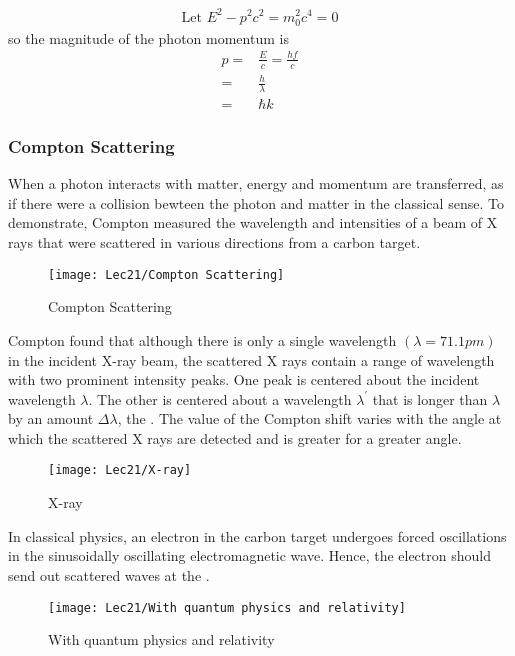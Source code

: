 \begin{align*}
    \text{Let } E^2-p^2c^2=m_0^2c^4=0
\end{align*}
so the magnitude of the photon momentum is 
\begin{align*}
    p=&\frac{E}{c}=\frac{hf}{c}\\
    =&\frac{h}{\lambda}\\
    =&\hbar k
\end{align*}

\subsubsection{Compton Scattering}
When a photon interacts with matter, energy and momentum are transferred, as if there were a collision bewteen the photon and matter in the classical sense. To demonstrate, Compton measured the wavelength and intensities of a beam of X rays that were scattered in various directions from a carbon target. 

\begin{figure}[H]
    \centering
    \texttt{[image: Lec21/Compton Scattering]}
    \caption{Compton Scattering}
\end{figure}

Compton found that although there is only a single wavelength $(\lambda=71.1 pm)$ in the incident X-ray beam, the scattered X rays contain a range of wavelength with two prominent intensity peaks. One peak is centered about the incident wavelength $\lambda$. The other is centered about a wavelength $\lambda^{\prime}$ that is longer than $\lambda$ by an amount $\Delta \lambda$, the . The value of the Compton shift varies with the angle at which the scattered X rays are detected and is greater for a greater angle. 

\begin{figure}[H]
    \centering
    \texttt{[image: Lec21/X-ray]}
    \caption{X-ray}
\end{figure}

In classical physics, an electron in the carbon target undergoes forced oscillations in the sinusoidally oscillating electromagnetic wave. Hence, the electron should send out scattered waves at the . 

\begin{figure}[H]
    \centering
    \texttt{[image: Lec21/With quantum physics and relativity]}
    \caption{With quantum physics and relativity}
\end{figure}


